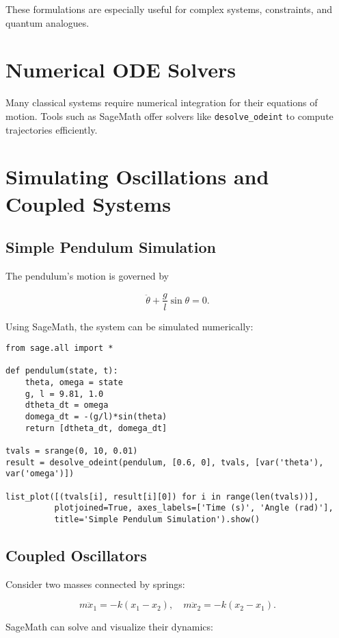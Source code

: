 \documentclass[12pt]{book}
\begin{document}
These formulations are especially useful for complex systems, constraints, and quantum analogues.

\section{Numerical ODE Solvers}

Many classical systems require numerical integration for their equations of motion. Tools such as SageMath offer solvers like \texttt{desolve\_odeint} to compute trajectories efficiently.

\section{Simulating Oscillations and Coupled Systems}

\subsection{Simple Pendulum Simulation}

The pendulum's motion is governed by

\[
\ddot{\theta} + \frac{g}{l} \sin \theta = 0.
\]

Using SageMath, the system can be simulated numerically:

\begin{verbatim}
from sage.all import *

def pendulum(state, t):
    theta, omega = state
    g, l = 9.81, 1.0
    dtheta_dt = omega
    domega_dt = -(g/l)*sin(theta)
    return [dtheta_dt, domega_dt]

tvals = srange(0, 10, 0.01)
result = desolve_odeint(pendulum, [0.6, 0], tvals, [var('theta'), var('omega')])

list_plot([(tvals[i], result[i][0]) for i in range(len(tvals))],
          plotjoined=True, axes_labels=['Time (s)', 'Angle (rad)'],
          title='Simple Pendulum Simulation').show()
\end{verbatim}

\subsection{Coupled Oscillators}

Consider two masses connected by springs:

\[
m \ddot{x}_1 = -k (x_1 - x_2), \quad m \ddot{x}_2 = -k(x_2 - x_1).
\]

SageMath can solve and visualize their dynamics:
\end{document}

